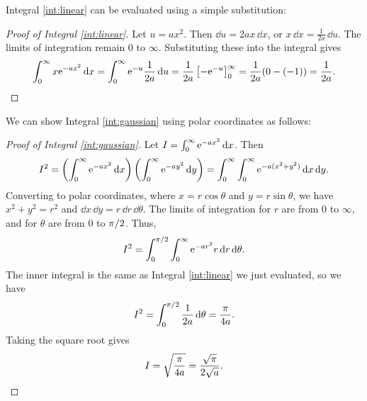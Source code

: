Integral \ref{int:linear} can be evaluated using a simple substitution:
\begin{proof}[Proof of Integral \ref{int:linear}]
  Let $u = ax^2$. Then $\dd u = 2ax\,\dd x$, or $x\,\dd x = \frac{1}{2a}\,\dd u$. The limits of integration remain $0$ to $\infty$. Substituting these into the integral gives
  \[
    \int_0^\infty x \mathrm{e}^{-ax^2}\,\mathrm{d} x = \int_0^\infty \mathrm{e}^{-u} \frac{1}{2a}\,\mathrm{d} u = \frac{1}{2a} \left[ -\mathrm{e}^{-u} \right]_0^\infty = \frac{1}{2a} (0 - (-1)) = \frac{1}{2a}. \qedhere
  \]
\end{proof}

We can show Integral \ref{int:gaussian} using polar coordinates as follows:
\begin{proof}[Proof of Integral \ref{int:gaussian}]
  Let $I = \int_0^\infty \mathrm{e}^{-ax^2}\,\mathrm{d} x$. Then
  \[
    I^2 = \left( \int_0^\infty \mathrm{e}^{-ax^2}\,\mathrm{d} x \right) \left( \int_0^\infty \mathrm{e}^{-ay^2}\,\mathrm{d} y \right) = \int_0^\infty \int_0^\infty \mathrm{e}^{-a(x^2 + y^2)}\,\mathrm{d} x\,\mathrm{d} y.
  \]
  Converting to polar coordinates, where $x = r\cos\theta$ and $y = r\sin\theta$, we have $x^2 + y^2 = r^2$ and $\dd x\,\dd y = r\,\dd r\,\dd\theta$. The limits of integration for $r$ are from $0$ to $\infty$, and for $\theta$ are from $0$ to $\mathrm{\pi}/2$. Thus,
  \[
    I^2 = \int_0^{\mathrm{\pi}/2} \int_0^\infty \mathrm{e}^{-ar^2} r\,\mathrm{d} r\,\mathrm{d}\theta.
  \]
  The inner integral is the same as Integral \ref{int:linear} we just evaluated, so we have
  \[
    I^2 = \int_0^{\mathrm{\pi}/2} \frac{1}{2a}\,\mathrm{d}\theta = \frac{\mathrm{\pi}}{4a}.
  \]
  Taking the square root gives
  \[
    I = \sqrt{\frac{\mathrm{\pi}}{4a}} = \frac{\sqrt{\mathrm{\pi}}}{2\sqrt{a}}. \qedhere
  \]
\end{proof}

